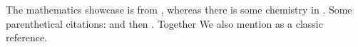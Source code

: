 \documentclass{article}
\begin{document}
 The mathematics showcase is from \citet{Graham1995}, whereas
 there is some chemistry in \citet{Thomas2008}.
 Some parenthetical citations: \citep{Graham1995}
 and then \citep[p.~56]{Thomas2008}.
 \citep[See][pp.~45--48]{Graham1995}
 Together \citep{Graham1995,Thomas2008}
We also mention \citet{Knuth1984} as a classic reference.
 
 
 
\end{document}
